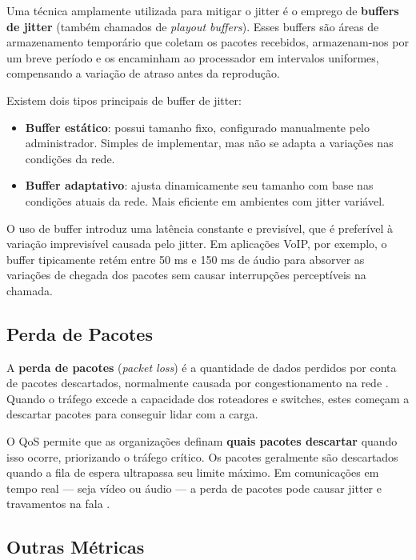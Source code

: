 Uma técnica amplamente utilizada para mitigar o jitter é o emprego de
\textbf{buffers de jitter} (também chamados de \textit{playout buffers}). Esses
buffers são áreas de armazenamento temporário que coletam os pacotes recebidos,
armazenam-nos por um breve período e os encaminham ao processador em intervalos
uniformes, compensando a variação de atraso antes da reprodução.

Existem dois tipos principais de buffer de jitter:

\begin{itemize}
  \item \textbf{Buffer estático}: possui tamanho fixo, configurado manualmente
  pelo administrador. Simples de implementar, mas não se adapta a variações nas
  condições da rede.
  \item \textbf{Buffer adaptativo}: ajusta dinamicamente seu tamanho com base nas
  condições atuais da rede. Mais eficiente em ambientes com jitter variável.
\end{itemize}

O uso de buffer introduz uma latência constante e previsível, que é preferível à
variação imprevisível causada pelo jitter. Em aplicações VoIP, por exemplo, o
buffer tipicamente retém entre 50 ms e 150 ms de áudio para absorver as variações
de chegada dos pacotes sem causar interrupções perceptíveis na chamada.

\subsection{Perda de Pacotes}

A \textbf{perda de pacotes} (\textit{packet loss}) é a quantidade de dados
perdidos por conta de pacotes descartados, normalmente causada por congestionamento
na rede \cite{fortinet2024}. Quando o tráfego excede a capacidade dos roteadores e
switches, estes começam a descartar pacotes para conseguir lidar com a carga.

O QoS permite que as organizações definam \textbf{quais pacotes descartar} quando
isso ocorre, priorizando o tráfego crítico. Os pacotes geralmente são descartados
quando a fila de espera ultrapassa seu limite máximo. Em comunicações em tempo
real — seja vídeo ou áudio — a perda de pacotes pode causar jitter e travamentos
na fala \cite{fortinet2024}.

\subsection{Outras Métricas}

